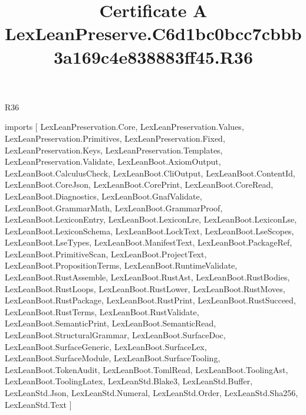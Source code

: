 \begin{lexlean}{R36}
\title{Certificate A LexLeanPreserve.C6d1bc0bcc7cbbb3a169c4e838883ff45.R36}
\begin{coremodule}
imports [
  LexLeanPreservation.Core,
  LexLeanPreservation.Values,
  LexLeanPreservation.Primitives,
  LexLeanPreservation.Fixed,
  LexLeanPreservation.Keys,
  LexLeanPreservation.Templates,
  LexLeanPreservation.Validate,
  LexLeanBoot.AxiomOutput,
  LexLeanBoot.CalculusCheck,
  LexLeanBoot.CliOutput,
  LexLeanBoot.ContentId,
  LexLeanBoot.CoreJson,
  LexLeanBoot.CorePrint,
  LexLeanBoot.CoreRead,
  LexLeanBoot.Diagnostics,
  LexLeanBoot.GnafValidate,
  LexLeanBoot.GrammarMath,
  LexLeanBoot.GrammarProof,
  LexLeanBoot.LexiconEntry,
  LexLeanBoot.LexiconLre,
  LexLeanBoot.LexiconLse,
  LexLeanBoot.LexiconSchema,
  LexLeanBoot.LockText,
  LexLeanBoot.LseScopes,
  LexLeanBoot.LseTypes,
  LexLeanBoot.ManifestText,
  LexLeanBoot.PackageRef,
  LexLeanBoot.PrimitiveScan,
  LexLeanBoot.ProjectText,
  LexLeanBoot.PropositionTerms,
  LexLeanBoot.RuntimeValidate,
  LexLeanBoot.RustAssemble,
  LexLeanBoot.RustAst,
  LexLeanBoot.RustBodies,
  LexLeanBoot.RustLoops,
  LexLeanBoot.RustLower,
  LexLeanBoot.RustMoves,
  LexLeanBoot.RustPackage,
  LexLeanBoot.RustPrint,
  LexLeanBoot.RustSucceed,
  LexLeanBoot.RustTerms,
  LexLeanBoot.RustValidate,
  LexLeanBoot.SemanticPrint,
  LexLeanBoot.SemanticRead,
  LexLeanBoot.StructuralGrammar,
  LexLeanBoot.SurfaceDoc,
  LexLeanBoot.SurfaceGeneric,
  LexLeanBoot.SurfaceLex,
  LexLeanBoot.SurfaceModule,
  LexLeanBoot.SurfaceTooling,
  LexLeanBoot.TokenAudit,
  LexLeanBoot.TomlRead,
  LexLeanBoot.ToolingAst,
  LexLeanBoot.ToolingLatex,
  LexLeanStd.Blake3,
  LexLeanStd.Buffer,
  LexLeanStd.Json,
  LexLeanStd.Numeral,
  LexLeanStd.Order,
  LexLeanStd.Sha256,
  LexLeanStd.Text
]


\end{coremodule}
\end{lexlean}
